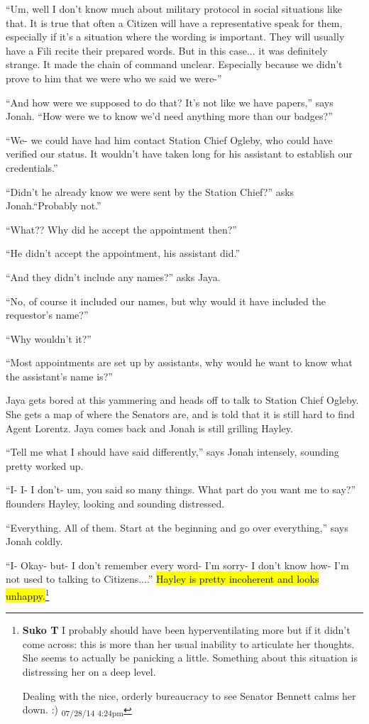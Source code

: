 ``Um, well I don't know much about military protocol in social situations like that.  It is true that often a Citizen will have a representative speak for them, especially if it's a situation where the wording is important.  They will usually have a Fili recite their prepared words.  But in this case... it was definitely strange.  It made the chain of command unclear.  Especially because we didn't prove to him that we were who we said we were-''

``And how were we supposed to do that?  It's not like we have papers,'' says Jonah. ``How were we to know we'd need anything more than our badges?''

``We- we could have had him contact Station Chief Ogleby, who could have verified our status.  It wouldn't have taken long for his assistant to establish our credentials.''

``Didn't he already know we were sent by the Station Chief?'' asks Jonah.``Probably not.''

``What??  Why did he accept the appointment then?''

``He didn't accept the appointment, his assistant did.''

``And they didn't include any names?'' asks Jaya.

``No, of course it included our names, but why would it have included the requestor's name?''

``Why wouldn't it?''

``Most appointments are set up by assistants, why would he want to know what the assistant's name is?''



Jaya gets bored at this yammering and heads off to talk to Station Chief Ogleby.  She gets a map of where the Senators are, and is told that it is still hard to find Agent Lorentz.  Jaya comes back and Jonah is still grilling Hayley.  



``Tell me what I should have said differently,'' says Jonah intensely, sounding pretty worked up.

``I- I- I don't- um, you said so many things.  What part do you want me to say?'' flounders Hayley, looking and sounding distressed.

``Everything.  All of them.  Start at the beginning and go over everything,'' says Jonah coldly.

``I- Okay- but- I don't remember every word- I'm sorry- I don't know how- I'm not used to talking to Citizens....'' \hl{Hayley is pretty incoherent and looks unhappy.}\footnote{\textbf{Suko T }I probably should have been hyperventilating more but if it didn't come across: this is more than her usual inability to articulate her thoughts.  She seems to actually be panicking a little.  Something about this situation is distressing her on a deep level.

Dealing with the nice, orderly bureaucracy to see Senator Bennett calms her down. :) \textsubscript{07/28/14 4:24pm}}

